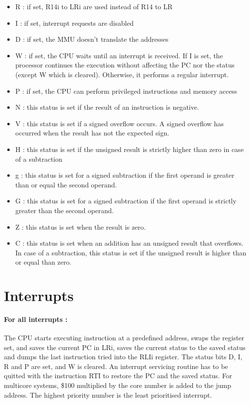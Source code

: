 \documentclass[11pt]{article}
\begin{document}
\begin{itemize}
    \item R : if set, R14i to LRi are used instead of R14 to LR
    \item I : if set, interrupt requests are disabled 
    \item D : if set, the MMU doesn't translate the addresses
    \item W : if set, the CPU waits until an interrupt is received. If I is
        set, the processor continues the execution without affecting the PC nor
        the status (except W which is cleared). Otherwise, it performs a
        regular interrupt.
    \item P : if set, the CPU can perform privileged instructions and memory access
    \item N : this status is set if the result of an instruction is negative.
    \item V : this status is set if a signed overflow occurs. A signed overflow has occurred
        when the result has not the expected sign.
    \item H : this status is set if the unsigned result is strictly higher than zero in case of
        a subtraction
    \item g : this status is set for a signed subtraction if the first operand is greater than
        or equal the second operand. 
    \item G : this status is set for a signed subtraction if the first operand is strictly 
        greater than the second operand. 
    \item Z : this status is set when the result is zero.
    \item C : this status is set when an addition has an unsigned result that overflows. In 
        case of a subtraction, this status is set if the unsigned result is higher than or equal 
        than zero. 
\end{itemize}

\newpage
\section{Interrupts}

\paragraph{For all interrupts : }
The CPU starts executing instruction at a predefined address, swaps the register set, 
and saves  the current PC in LRi, saves the current status to the saved status and 
dumps the last instruction tried into the RLIi register.
The status bits D, I, R and P are set, and W is cleared. An interrupt servicing routine has to
be quitted with the instruction RTI to restore the PC and the saved status.
For multicore systems, \$100 multiplied by the core number is added to the jump address.
The highest priority number is the least prioritised interrupt.
\end{document}
